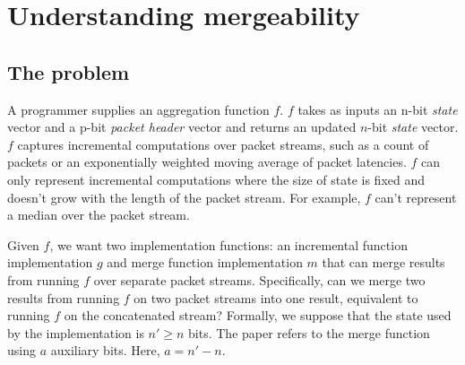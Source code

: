 
\chapter{Understanding mergeability}

\section{The problem}

A programmer supplies an aggregation function $f$. $f$ takes as inputs an n-bit \emph{state}
vector and a p-bit \emph{packet header} vector and returns an updated $n$-bit
\emph{state} vector. $f$ captures incremental computations over packet streams,
such as a count of packets or an exponentially weighted moving average of
packet latencies. $f$ can only represent incremental computations where the
size of state is fixed and doesn't grow with the length of the packet stream.
For example, $f$ can't represent a median over the packet stream.

Given $f$, we want two implementation functions: an incremental function implementation $g$
 and merge function implementation $m$ that can merge results from
running $f$ over separate packet streams. Specifically, can we merge
two results from running $f$ on two packet streams into one result,
equivalent to running $f$ on the concatenated stream? Formally, we suppose that the state used by
the implementation is $n' \geq n$ bits. The paper refers to the merge function using $a$ auxiliary bits.
Here, $a = n' - n$. 

